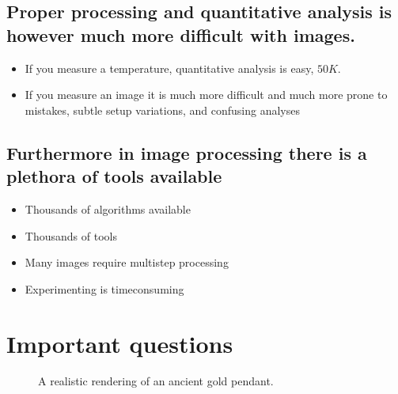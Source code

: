 \documentclass[letterpaper,10pt,english]{sphinxmanual}
\begin{document}
\subsection{Proper processing and quantitative analysis is however much more difficult with images.}
\label{\detokenize{01-Introduction:proper-processing-and-quantitative-analysis-is-however-much-more-difficult-with-images}}\begin{itemize}
\item {} 
\sphinxAtStartPar
If you measure a temperature, quantitative analysis is easy, \(50K\).

\item {} 
\sphinxAtStartPar
If you measure an image it is much more difficult and much more prone to mistakes, subtle setup variations, and confusing analyses

\end{itemize}


\subsection{Furthermore in image processing there is a plethora of tools available}
\label{\detokenize{01-Introduction:furthermore-in-image-processing-there-is-a-plethora-of-tools-available}}\begin{itemize}
\item {} 
\sphinxAtStartPar
Thousands of algorithms available

\item {} 
\sphinxAtStartPar
Thousands of tools

\item {} 
\sphinxAtStartPar
Many images require multi\sphinxhyphen{}step processing

\item {} 
\sphinxAtStartPar
Experimenting is time\sphinxhyphen{}consuming

\end{itemize}


\section{Important questions}
\label{\detokenize{01-Introduction:important-questions}}
\begin{figure}[htbp]
\centering
\capstart

\noindent{}
\caption{A realistic rendering of an ancient gold pendant.}\label{\detokenize{01-Introduction:id20}}\end{figure}
\end{document}
